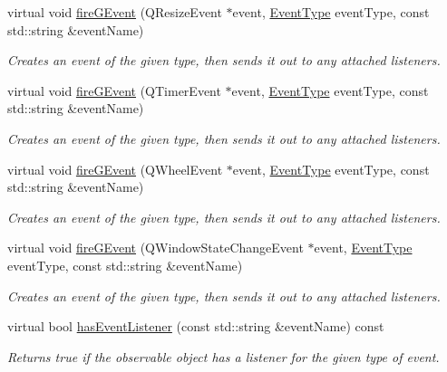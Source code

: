 \begin{DoxyCompactItemize}
virtual void \mbox{\hyperlink{classsgl_1_1GObservable_a63fd9034e1e1633c1c38eb342bfd34e9}{fire\+G\+Event}} (Q\+Resize\+Event $\ast$event, \mbox{\hyperlink{namespacesgl_a2628ea8d12e8b2563c32f05dc7fff6fa}{Event\+Type}} event\+Type, const std\+::string \&event\+Name)
\begin{DoxyCompactList}\small\item\em Creates an event of the given type, then sends it out to any attached listeners. \end{DoxyCompactList}\item 
virtual void \mbox{\hyperlink{classsgl_1_1GObservable_a741345310d9b7c5170a6cbc410c44ac4}{fire\+G\+Event}} (Q\+Timer\+Event $\ast$event, \mbox{\hyperlink{namespacesgl_a2628ea8d12e8b2563c32f05dc7fff6fa}{Event\+Type}} event\+Type, const std\+::string \&event\+Name)
\begin{DoxyCompactList}\small\item\em Creates an event of the given type, then sends it out to any attached listeners. \end{DoxyCompactList}\item 
virtual void \mbox{\hyperlink{classsgl_1_1GObservable_a93bf338968a0338761b8e4dc62f582e9}{fire\+G\+Event}} (Q\+Wheel\+Event $\ast$event, \mbox{\hyperlink{namespacesgl_a2628ea8d12e8b2563c32f05dc7fff6fa}{Event\+Type}} event\+Type, const std\+::string \&event\+Name)
\begin{DoxyCompactList}\small\item\em Creates an event of the given type, then sends it out to any attached listeners. \end{DoxyCompactList}\item 
virtual void \mbox{\hyperlink{classsgl_1_1GObservable_a2a70a7d7435ff0c3b80bb4d70da19e0d}{fire\+G\+Event}} (Q\+Window\+State\+Change\+Event $\ast$event, \mbox{\hyperlink{namespacesgl_a2628ea8d12e8b2563c32f05dc7fff6fa}{Event\+Type}} event\+Type, const std\+::string \&event\+Name)
\begin{DoxyCompactList}\small\item\em Creates an event of the given type, then sends it out to any attached listeners. \end{DoxyCompactList}\item 
virtual bool \mbox{\hyperlink{classsgl_1_1GObservable_a9f6faaa25942923bafa1c44020c49fa9}{has\+Event\+Listener}} (const std\+::string \&event\+Name) const
\begin{DoxyCompactList}\small\item\em Returns true if the observable object has a listener for the given type of event. \end{DoxyCompactList}\item 

\end{DoxyCompactItemize}
